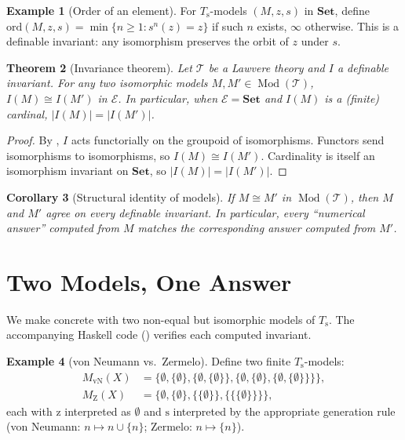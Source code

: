 \documentclass[12pt]{article}
\newtheorem{theorem}{Theorem}[section]
\newtheorem{corollary}[theorem]{Corollary}
\theoremstyle{definition}
\newtheorem{example}[theorem]{Example}
\theoremstyle{remark}
\newcommand{\Set}{\mathbf{Set}}
\newcommand{\T}{\mathcal{T}}
\newcommand{\E}{\mathcal{E}}
\newcommand{\Mod}[1]{\operatorname{Mod}(#1)}
\newcommand{\iso}{\cong}
\newcommand{\succop}{\mathrm{s}}
\newcommand{\zeroop}{\mathrm{z}}
\begin{document}
\begin{example}[Order of an element]
For $T_\succop$-models $(M,z,s)$ in $\Set$, define $\mathrm{ord}(M,z,s) = \min \{ n \geq 1 : s^n(z) = z \}$ if such $n$ exists, $\infty$ otherwise. This is a definable invariant: any isomorphism preserves the orbit of $z$ under $s$.
\end{example}

\begin{theorem}[Invariance theorem]\label{thm:invariance}
Let $\T$ be a Lawvere theory and $I$ a definable invariant. For any two isomorphic models $M, M' \in \Mod{\T}$, $I(M) \iso I(M')$ in $\E$. In particular, when $\E = \Set$ and $I(M)$ is a (finite) cardinal, $|I(M)| = |I(M')|$.
\end{theorem}

\begin{proof}
By , $I$ acts functorially on the groupoid of isomorphisms. Functors send isomorphisms to isomorphisms, so $I(M) \iso I(M')$. Cardinality is itself an isomorphism invariant on $\Set$, so $|I(M)| = |I(M')|$.
\end{proof}

\begin{corollary}[Structural identity of models]
If $M \iso M'$ in $\Mod{\T}$, then $M$ and $M'$ agree on every definable invariant. In particular, every ``numerical answer'' computed from $M$ matches the corresponding answer computed from $M'$.
\end{corollary}

\section{Two Models, One Answer}\label{sec:two-models}

We make  concrete with two non-equal but isomorphic models of $T_\succop$. The accompanying Haskell code () verifies each computed invariant.

\begin{example}[von Neumann vs.\ Zermelo]\label{ex:vN-Z}
Define two finite $T_\succop$-models:
\begin{align*}
  M_{\mathrm{vN}}(X) &= \{\emptyset, \{\emptyset\}, \{\emptyset,\{\emptyset\}\}, \{\emptyset,\{\emptyset\},\{\emptyset,\{\emptyset\}\}\}\}, \\
  M_{\mathrm{Z}}(X) &= \{\emptyset, \{\emptyset\}, \{\{\emptyset\}\}, \{\{\{\emptyset\}\}\}\},
\end{align*}
each with $\zeroop$ interpreted as $\emptyset$ and $\succop$ interpreted by the appropriate generation rule (von Neumann: $n \mapsto n \cup \{n\}$; Zermelo: $n \mapsto \{n\}$).
\end{example}
\end{document}
